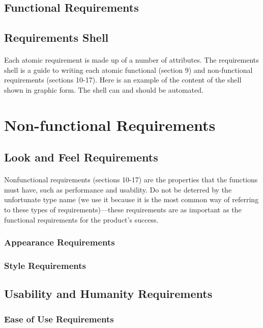 \documentclass[12pt,a4paper]{article}
\begin{document}
\subsection{Functional Requirements}
\subsection{Requirements Shell}
\paragraph{}
Each atomic requirement is made up of a number of attributes. The requirements shell is a guide to writing each atomic functional (section 9) and non-functional requirements (sections 10-17). Here is an example of the content of the shell shown in graphic form. The shell can and should be automated.
\pagebreak
\section{Non-functional Requirements}
\subsection{Look and Feel Requirements}
\paragraph{}
Nonfunctional requirements (sections 10-17) are the properties that the functions must have, such as performance and usability. Do not be deterred by the unfortunate type name (we use it because it is the most common way of referring to these types of requirements)—these requirements are as important as the functional requirements for the product’s success.
\subsubsection{Appearance Requirements}
\subsubsection{Style Requirements}
\subsection{Usability and Humanity Requirements}
\subsubsection{Ease of Use Requirements}
\end{document}
